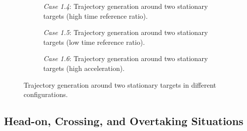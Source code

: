 \begin{figure}
    \centering
    \begin{subfigure}[b]{\textwidth}
        \centering
        
        \caption{\emph{Case 1.4}: Trajectory generation around two stationary targets (high time reference ratio).}
        \label{fig:stationary-target-5}
    \end{subfigure}
    \hfill
    \begin{subfigure}[b]{\textwidth}
        \centering
        
        \caption{\emph{Case 1.5}: Trajectory generation around two stationary targets (low time reference ratio).}
        \label{fig:stationary-target-6}
    \end{subfigure}
    \hfill
    \begin{subfigure}[b]{\textwidth}
        \centering
        
        \caption{\emph{Case 1.6}: Trajectory generation around two stationary targets (high acceleration).}
        \label{fig:stationary-target-7}
    \end{subfigure}
    \caption{Trajectory generation around two stationary targets in different configurations.}
    \label{fig:stationary-targets-subfigures-2}
\end{figure}


\FloatBarrier
\subsection{Head-on, Crossing, and Overtaking Situations}
\label{sec:case-2-head-on}

